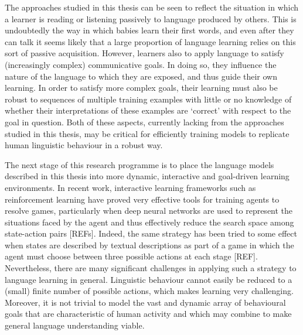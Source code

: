 The approaches studied in this thesis can be seen to reflect the situation in which a learner is reading or listening passively to language produced by others. This is undoubtedly the way in which babies learn their first words, and even after they can talk it seems likely that a large proportion of language learning relies on this sort of passive acquisition. However, learners also to apply language to satisfy (increasingly complex) communicative goals. In doing so, they influence the nature of the language to which they are exposed, and thus guide their own learning. In order to satisfy more complex goals, their learning must also be robust to sequences of multiple training examples with little or no knowledge of whether their interpretations of these examples are `correct' with respect to the goal in question. Both of these aspects, currently lacking from the approaches studied in this thesis, may be critical for efficiently training models to replicate human linguistic behaviour in a robust way.

The next stage of this research programme is to place the language models described in this thesis into more dynamic, interactive and goal-driven learning environments. In recent work, interactive learning frameworks such as reinforcement learning have proved very effective tools for training agents to resolve games, particularly when deep neural networks are used to represent the situations faced by the agent and thus effectively reduce the search space among state-action pairs [REFs]. Indeed, the same strategy has been tried to some effect when states are described by textual descriptions as part of a game in which the agent must choose between three possible actions at each stage [REF]. Nevertheless, there are many significant challenges in applying such a strategy to language learning in general. Linguistic behaviour cannot easily be reduced to a (small) finite number of possible actions, which makes learning very challenging. Moreover, it is not trivial to model the vast and dynamic array of behavioural goals that are characteristic of human activity and which may combine to make general language understanding viable. 

 